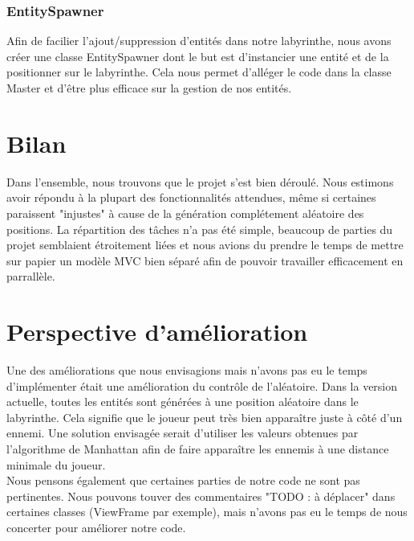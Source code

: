 \documentclass[a4paper]{article}
\begin{document}
\subsubsection{EntitySpawner}
Afin de facilier l'ajout/suppression d'entités dans notre labyrinthe, nous avons
créer une classe EntitySpawner dont le but est d'instancier une entité et de
la positionner sur le labyrinthe. Cela nous permet d'alléger le code dans la
classe Master et d'être plus efficace sur la gestion de nos entités.


\newpage
\section{Bilan}
Dans l'ensemble, nous trouvons que le projet s'est bien déroulé. Nous estimons
avoir répondu à la plupart des fonctionnalités attendues, même si certaines
paraissent "injustes" à cause de la génération complétement aléatoire des
positions.
La répartition des tâches n'a pas été simple, beaucoup de parties du projet
semblaient étroitement liées et nous avions du prendre le temps de mettre sur
papier un modèle MVC bien séparé afin de pouvoir travailler efficacement
en parrallèle.

\section{Perspective d'amélioration}

Une des améliorations que nous envisagions mais n'avons pas eu le temps
d'implémenter était une amélioration du contrôle de l'aléatoire. Dans la version
actuelle, toutes les entités sont générées à une position aléatoire dans le
labyrinthe. Cela signifie que le joueur peut très bien apparaître juste à côté
d'un ennemi. Une solution envisagée serait d'utiliser les valeurs obtenues par
l'algorithme de Manhattan afin de faire apparaître les ennemis à une distance
minimale du joueur. \\
Nous pensons également que certaines parties de notre code ne sont pas
pertinentes. Nous pouvons touver des commentaires "TODO : à déplacer" dans
certaines classes (ViewFrame par exemple), mais n'avons pas eu le temps de
nous concerter pour améliorer notre code.

\end{document}
